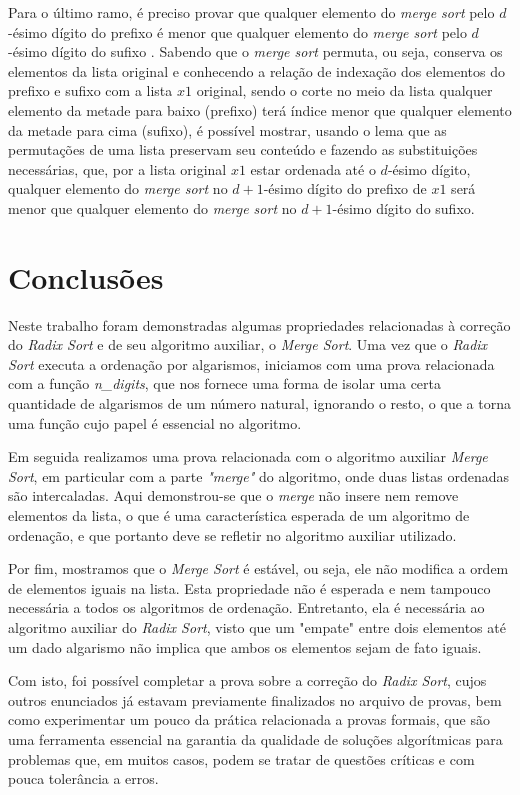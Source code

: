 \documentclass[a4paper, 12pt]{article}
\begin{document}
    Para o último ramo, é preciso provar que qualquer elemento do \textit{merge sort} pelo $d$-ésimo dígito do prefixo é menor que qualquer elemento do  \textit{merge sort} pelo $d$-ésimo dígito do sufixo . Sabendo que o \textit{merge sort} permuta, ou seja, conserva os elementos da lista original e conhecendo a relação de indexação dos elementos do prefixo e sufixo com a lista $x1$ original, sendo o corte no meio da lista qualquer elemento da metade para baixo (prefixo) terá índice menor que qualquer elemento da metade para cima (sufixo), é possível mostrar, usando o lema que as permutações de uma lista preservam seu conteúdo e fazendo as substituições necessárias, que, por a lista original $x1$ estar ordenada até o $d$-ésimo dígito, qualquer elemento do \textit{merge sort} no $d + 1$-ésimo dígito do prefixo de $x1$ será menor que qualquer elemento do \textit{merge sort} no $d + 1$-ésimo dígito do sufixo. 

\section{Conclusões}
\label{sec:Conclusao}

Neste trabalho foram demonstradas algumas propriedades relacionadas
à correção do \textit{Radix Sort} e de seu algoritmo auxiliar, o
\textit{Merge Sort}. Uma vez que o \textit{Radix Sort} executa a
ordenação por algarismos, iniciamos com uma prova relacionada com
a função \textit{n\_digits}, que nos fornece uma forma de isolar
uma certa quantidade de algarismos de um número natural, ignorando
o resto, o que a torna uma função cujo papel é essencial no algoritmo.

Em seguida realizamos uma prova relacionada com o algoritmo auxiliar
\textit{Merge Sort}, em particular com a parte \textit{"merge"}
do algoritmo, onde duas listas ordenadas são intercaladas. Aqui
demonstrou-se que o \textit{merge} não insere nem remove elementos
da lista, o que é uma característica esperada de um algoritmo
de ordenação, e que portanto deve se refletir no algoritmo auxiliar
utilizado.

Por fim, mostramos que o \textit{Merge Sort} é estável, ou seja,
ele não modifica a ordem de elementos iguais na lista. Esta
propriedade não é esperada e nem tampouco necessária a todos
os algoritmos de ordenação. Entretanto, ela é necessária ao algoritmo
auxiliar do \textit{Radix Sort}, visto que um "empate" entre dois
elementos até um dado algarismo não implica que ambos os elementos
sejam de fato iguais.

Com isto, foi possível completar a prova sobre a correção do
\textit{Radix Sort}, cujos outros enunciados já estavam previamente
finalizados no arquivo de provas, bem como experimentar um pouco
da prática relacionada a provas formais, que são uma ferramenta
essencial na garantia da qualidade de soluções algorítmicas para
problemas que, em muitos casos, podem se tratar de questões críticas e
com pouca tolerância a erros.

	

\end{document}
